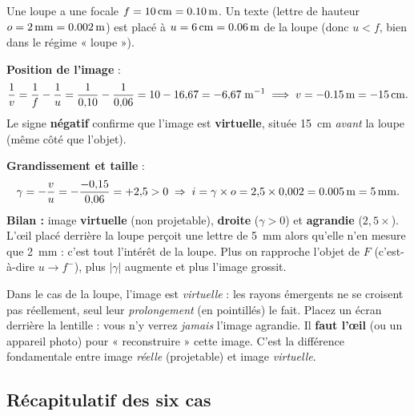 \documentclass[11pt,a4paper]{article}
\newcommand{\gamm}{\gamma}             %
\begin{document}
\begin{exemple}
Une loupe a une focale $f=\SI{10}{\centi\metre}=\SI{0{,}10}{\metre}$. Un texte (lettre de hauteur
$o=\SI{2}{\milli\metre}=\SI{0{,}002}{\metre}$) est placé à $u=\SI{6}{\centi\metre}=\SI{0{,}06}{\metre}$
de la loupe (donc $u<f$, bien dans le régime « loupe »).

\smallskip
\textbf{Position de l'image} :
\[ \frac{1}{v}=\frac{1}{f}-\frac{1}{u}=\frac{1}{0{,}10}-\frac{1}{0{,}06}=10-16{,}67=-6{,}67\;\si{\per\metre}
   \;\Longrightarrow\; v=\SI{-0{,}15}{\metre}=\SI{-15}{\centi\metre}. \]
Le signe \textbf{négatif} confirme que l'image est \textbf{virtuelle}, située \SI{15}{\centi\metre}
\emph{avant} la loupe (même côté que l'objet).

\smallskip
\textbf{Grandissement et taille} :
\[ \gamm=-\frac{v}{u}=-\frac{-0{,}15}{0{,}06}=+2{,}5>0 \;\Rightarrow\; i=\gamm\times o=2{,}5\times 0{,}002=\SI{0{,}005}{\metre}=\SI{5}{\milli\metre}. \]
\textbf{Bilan :} image \textbf{virtuelle} (non projetable), \textbf{droite} ($\gamm>0$) et
\textbf{agrandie} ($2{,}5\times$). L'œil placé derrière la loupe perçoit une lettre de \SI{5}{\milli\metre}
alors qu'elle n'en mesure que \SI{2}{\milli\metre} : c'est tout l'intérêt de la loupe. Plus on
rapproche l'objet de $F$ (c'est-à-dire $u\to f^-$), plus $|\gamm|$ augmente et plus l'image grossit.
\end{exemple}

\begin{attention}
Dans le cas de la loupe, l'image est \emph{virtuelle} : les rayons émergents ne se croisent pas
réellement, seul leur \emph{prolongement} (en pointillés) le fait. Placez un écran derrière la
lentille : vous n'y verrez \emph{jamais} l'image agrandie. Il \textbf{faut l'œil} (ou un appareil
photo) pour « reconstruire » cette image. C'est la différence fondamentale entre image \emph{réelle}
(projetable) et image \emph{virtuelle}.
\end{attention}

\subsection{Récapitulatif des six cas}
\end{document}
